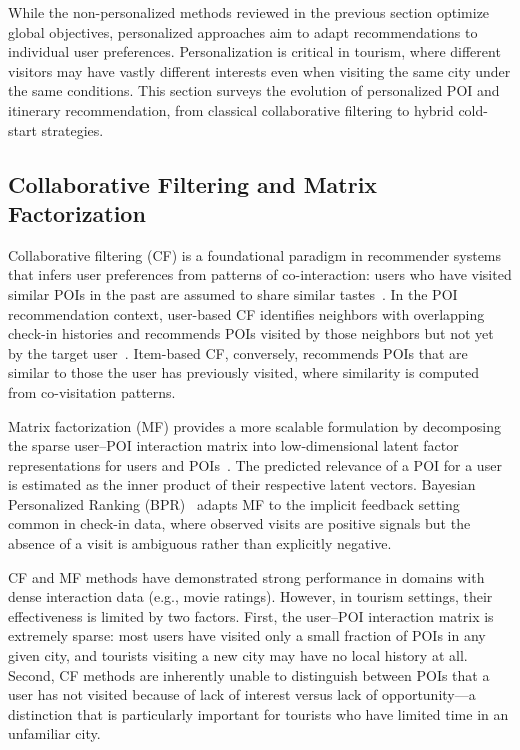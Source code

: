 While the non-personalized methods reviewed in the previous section optimize global objectives, personalized approaches aim to adapt recommendations to individual user preferences. Personalization is critical in tourism, where different visitors may have vastly different interests even when visiting the same city under the same conditions. This section surveys the evolution of personalized POI and itinerary recommendation, from classical collaborative filtering to hybrid cold-start strategies.

\subsection{Collaborative Filtering and Matrix Factorization}
\label{sec:sota-pers-cf}

Collaborative filtering (CF) is a foundational paradigm in recommender systems that infers user preferences from patterns of co-interaction: users who have visited similar POIs in the past are assumed to share similar tastes~\cite{koren2009mf}. In the POI recommendation context, user-based CF identifies neighbors with overlapping check-in histories and recommends POIs visited by those neighbors but not yet by the target user~\cite{zheng2011ubcf}. Item-based CF, conversely, recommends POIs that are similar to those the user has previously visited, where similarity is computed from co-visitation patterns.

Matrix factorization (MF) provides a more scalable formulation by decomposing the sparse user--POI interaction matrix into low-dimensional latent factor representations for users and POIs~\cite{koren2009mf}. The predicted relevance of a POI for a user is estimated as the inner product of their respective latent vectors. Bayesian Personalized Ranking (BPR)~\cite{rendle2009bpr} adapts MF to the implicit feedback setting common in check-in data, where observed visits are positive signals but the absence of a visit is ambiguous rather than explicitly negative.

CF and MF methods have demonstrated strong performance in domains with dense interaction data (e.g., movie ratings). However, in tourism settings, their effectiveness is limited by two factors. First, the user--POI interaction matrix is extremely sparse: most users have visited only a small fraction of POIs in any given city, and tourists visiting a new city may have no local history at all. Second, CF methods are inherently unable to distinguish between POIs that a user has not visited because of lack of interest versus lack of opportunity---a distinction that is particularly important for tourists who have limited time in an unfamiliar city.


